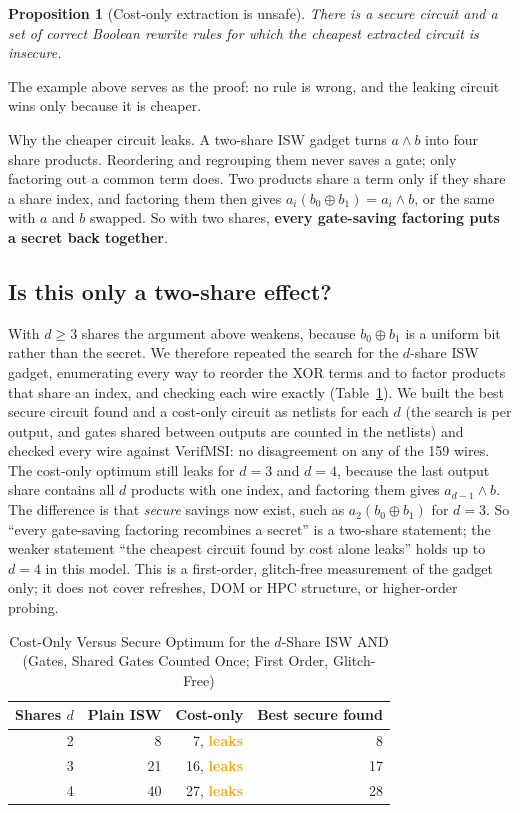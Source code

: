 \documentclass[conference]{IEEEtran}
\newtheorem{proposition}{Proposition}
\newcommand{\bad}{\textcolor{orange}{\textbf{leaks}}}
\begin{document}
\begin{proposition}[Cost-only extraction is unsafe]
There is a secure circuit and a set of correct Boolean rewrite rules for which the cheapest extracted circuit is insecure.
\end{proposition}
The example above serves as the proof: no rule is wrong, and the leaking circuit wins only because it is cheaper.

\begin{finding}{Why the cheaper circuit leaks.}
A two-share ISW gadget turns $a\wedge b$ into four share products. Reordering and regrouping them never saves a gate; only factoring out a common term does. Two products share a term only if they share a share index, and factoring them then gives $a_i(b_0\oplus b_1)=a_i\wedge b$, or the same with $a$ and $b$ swapped. So with two shares, \textbf{every gate-saving factoring puts a secret back together}.
\end{finding}

\subsection{Is this only a two-share effect?}\label{sec:shares}
With $d\ge 3$ shares the argument above weakens, because $b_0\oplus b_1$ is a uniform bit rather than the secret. We therefore repeated the search for the $d$-share ISW gadget, enumerating every way to reorder the XOR terms and to factor products that share an index, and checking each wire exactly (Table~\ref{tab:shares}). We built the best secure circuit found and a cost-only circuit as netlists for each $d$ (the search is per output, and gates shared between outputs are counted in the netlists) and checked every wire against VerifMSI: no disagreement on any of the 159 wires. The cost-only optimum still leaks for $d=3$ and $d=4$, because the last output share contains all $d$ products with one index, and factoring them gives $a_{d-1}\wedge b$. The difference is that \emph{secure} savings now exist, such as $a_2(b_0\oplus b_1)$ for $d=3$. So ``every gate-saving factoring recombines a secret'' is a two-share statement; the weaker statement ``the cheapest circuit found by cost alone leaks'' holds up to $d=4$ in this model. This is a first-order, glitch-free measurement of the gadget only; it does not cover refreshes, DOM or HPC structure, or higher-order probing.

\begin{table}[t]
\caption{Cost-Only Versus Secure Optimum for the $d$-Share ISW AND (Gates, Shared Gates Counted Once; First Order, Glitch-Free)}\label{tab:shares}
\centering\footnotesize
\begin{tabular}{@{}rrrr@{}}
\toprule
Shares $d$ & Plain ISW & Cost-only & Best secure found\\\midrule
2 & 8 & 7, \bad & 8\\
3 & 21 & 16, \bad & 17\\
4 & 40 & 27, \bad & 28\\
\bottomrule
\end{tabular}
\end{table}
\end{document}
